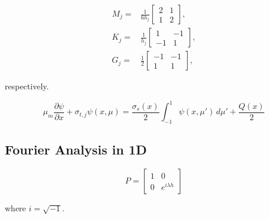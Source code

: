 \begin{equation}
\label{MIP_1D_matrices}
\begin{aligned}
	M_j =& \frac{1}{6h_j}
	\left[ \begin{array}{cc}
	2 & 1 \\
	1 & 2 
	\end{array} \right] ,\\
	K_j =& \frac{1}{h_j}
	\left[ \begin{array}{cc}
	1 & -1 \\
	-1 & 1 
	\end{array} \right] ,\\
	G_j =& \frac{1}{2}
	\left[ \begin{array}{cc}
	-1 & -1 \\
	 1 & 1 
	\end{array} \right] ,
\end{aligned}
\end{equation}

\noindent respectively.


\begin{equation}
\label{eq:1D_transport_discrete}
\mu_m \frac{\partial \psi}{\partial x} + \sigma_{t,j} \psi(x,\mu) = \frac{\sigma_s (x)}{2} \int_{-1}^{1} \psi(x,\mu') \, d\mu' + \frac{Q(x)}{2}
\end{equation}


\subsection{Fourier Analysis in 1D}
\label{sec::appendix_DSA_1D_Fourier}

\begin{equation}
\label{eq::1D_phase_matrix}
P = \left[ \begin{array}{cc}
	1 & 0 \\
	0 & e^{i \lambda h}
	\end{array} \right]
\end{equation}

\noindent where $i=\sqrt{-1}$.


